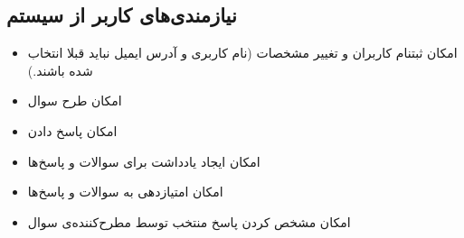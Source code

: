 \documentclass[paper=a4, fontsize=11pt]{article}
\numberwithin{equation}{section} %
\numberwithin{figure}{section} %
\numberwithin{table}{section} %
\begin{document}
\subsection{نیازمندی‌های کاربر از سیستم}
\begin{itemize}
    \item امکان ثبتنام کاربران و تغییر مشخصات (نام کاربری و آدرس ایمیل نباید قبلا انتخاب شده باشند.)
    \item امکان طرح سوال
    \item امکان پاسخ دادن
    \item امکان ایجاد یادداشت برای سوالات و پاسخ‌ها
    \item امکان امتیازدهی به سوالات و پاسخ‌ها
    \item امکان مشخص کردن پاسخ منتخب توسط مطرح‌کننده‌ی سوال
\end{itemize}
\end{document}
